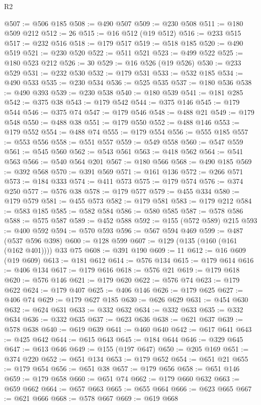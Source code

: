 \begin{lexlean}{R2}
\begin{coremodule}
@507 := @506 @185
@508 := @490 @507
@509 := @230 @508
@511 := @180 @509 @212
@512 := 26
@515 := @16 @512 (@19 @512)
@516 := @233 @515
@517 := @232 @516
@518 := @179 @517
@519 := @518 @185
@520 := @490 @519
@521 := @230 @520
@522 := @511 @521
@523 := @499 @522
@525 := @180 @523 @212
@526 := 30
@529 := @16 @526 (@19 @526)
@530 := @233 @529
@531 := @232 @530
@532 := @179 @531
@533 := @532 @185
@534 := @490 @533
@535 := @230 @534
@536 := @525 @535
@537 := @180 @536
@538 := @490 @393
@539 := @230 @538
@540 := @180 @539
@541 := @181 @285
@542 := @375 @38
@543 := @179 @542
@544 := @375 @146
@545 := @179 @544
@546 := @375 @74
@547 := @179 @546
@548 := @488 @21
@549 := @179 @548
@550 := @488 @38
@551 := @179 @550
@552 := @488 @146
@553 := @179 @552
@554 := @488 @74
@555 := @179 @554
@556 := @555 @185
@557 := @553 @556
@558 := @551 @557
@559 := @549 @558
@560 := @547 @559
@561 := @545 @560
@562 := @543 @561
@563 := @418 @562
@564 := @541 @563
@566 := @540 @564 @201
@567 := @180 @566
@568 := @490 @185
@569 := @392 @568
@570 := @391 @569
@571 := @161 @136
@572 := @266 @571
@573 := @184 @333
@574 := @411 @573
@575 := @179 @574
@576 := @374 @250
@577 := @576 @38
@578 := @179 @577
@579 := @455 @334
@580 := @179 @579
@581 := @455 @573
@582 := @179 @581
@583 := @179 @212
@584 := @583 @185
@585 := @582 @584
@586 := @580 @585
@587 := @578 @586
@588 := @575 @587
@589 := @452 @588
@592 := @155 (@572 @589) @215
@593 := @400 @592
@594 := @570 @593
@596 := @567 @594 @469
@599 := @487 (@537 @596 @398)
@600 := @128 @599
@607 := @129 (@135 (@160 (@161 (@162 @401)))) @33 @75
@608 := @391 @190
@609 := 11
@612 := @16 @609 (@19 @609)
@613 := @181 @612
@614 := @576 @134
@615 := @179 @614
@616 := @406 @134
@617 := @179 @616
@618 := @576 @21
@619 := @179 @618
@620 := @576 @146
@621 := @179 @620
@622 := @576 @74
@623 := @179 @622
@624 := @179 @407
@625 := @406 @146
@626 := @179 @625
@627 := @406 @74
@629 := @179 @627 @185
@630 := @626 @629
@631 := @454 @630
@632 := @624 @631
@633 := @332 @632
@634 := @332 @633
@635 := @332 @634
@636 := @332 @635
@637 := @623 @636
@638 := @621 @637
@639 := @578 @638
@640 := @619 @639
@641 := @460 @640
@642 := @617 @641
@643 := @425 @642
@644 := @615 @643
@645 := @184 @644
@646 := @329 @645
@647 := @613 @646
@649 := @155 (@197 @647)
@650 := @205 @169
@651 := @374 @220
@652 := @651 @134
@653 := @179 @652
@654 := @651 @21
@655 := @179 @654
@656 := @651 @38
@657 := @179 @656
@658 := @651 @146
@659 := @179 @658
@660 := @651 @74
@662 := @179 @660 @632
@663 := @659 @662
@664 := @657 @663
@665 := @655 @664
@666 := @623 @665
@667 := @621 @666
@668 := @578 @667
@669 := @619 @668

\end{coremodule}
\end{lexlean}
